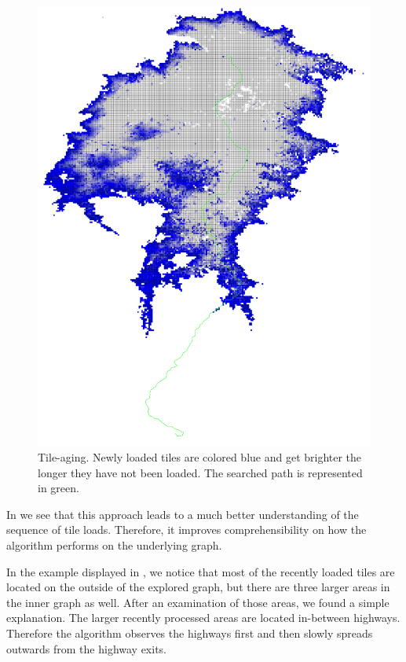 \documentclass
[
    paper = a4,
    pagesize,
    12 pt,
    twoside,                       %
    open = right,
    DIV = calc,
    BCOR = 0 mm,                   %
    bibtotoc
]
{scrbook}
\begin{document}
\begin{figure}
    \includegraphics[width=\textwidth]{Images/vis-aged-coloring.png}
\caption[]{Tile-aging. Newly loaded tiles are colored blue and get brighter the longer they have not been loaded. The searched path is represented in green.}
\label{fig:color_aged_tile}
\end{figure}

In  we see that this approach leads to a much better understanding of the sequence of tile loads.
Therefore, it improves comprehensibility on how the algorithm performs on the underlying graph.

In the example displayed in , we notice that most of the recently loaded tiles are located on the outside of the explored graph, but there are three larger areas in the inner graph as well.
After an examination of those areas, we found a simple explanation.
The larger recently processed areas are located in-between highways.
Therefore the algorithm observes the highways first and then slowly spreads outwards from the highway exits.
\end{document}
